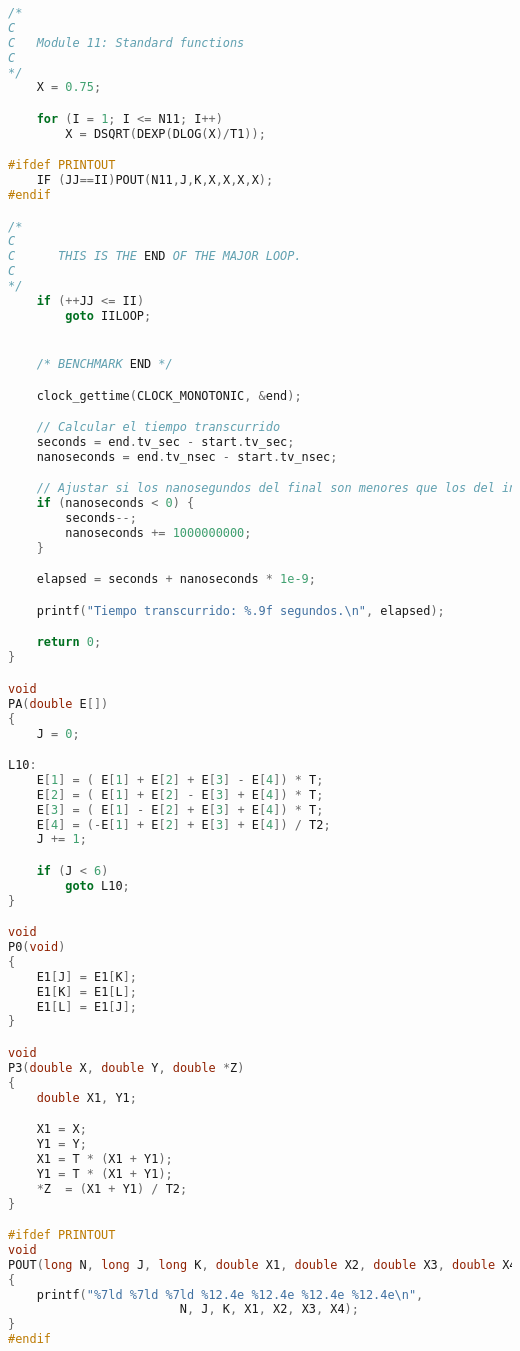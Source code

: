\begin{lstlisting}[language=C,frame=single,showstringspaces=false,caption={Código fuente del benchmark Whetstone},label=lst:whetstone-benchmark]
/*
C
C	Module 11: Standard functions
C
*/
	X = 0.75;

	for (I = 1; I <= N11; I++)
		X = DSQRT(DEXP(DLOG(X)/T1));

#ifdef PRINTOUT
	IF (JJ==II)POUT(N11,J,K,X,X,X,X);
#endif

/*
C
C      THIS IS THE END OF THE MAJOR LOOP.
C
*/
	if (++JJ <= II)
		goto IILOOP;


	/* BENCHMARK END */

	clock_gettime(CLOCK_MONOTONIC, &end);

	// Calcular el tiempo transcurrido
    seconds = end.tv_sec - start.tv_sec;
    nanoseconds = end.tv_nsec - start.tv_nsec;

    // Ajustar si los nanosegundos del final son menores que los del inicio
    if (nanoseconds < 0) {
        seconds--;
        nanoseconds += 1000000000;
    }

    elapsed = seconds + nanoseconds * 1e-9;

    printf("Tiempo transcurrido: %.9f segundos.\n", elapsed);

	return 0;
}

void
PA(double E[])
{
	J = 0;

L10:
	E[1] = ( E[1] + E[2] + E[3] - E[4]) * T;
	E[2] = ( E[1] + E[2] - E[3] + E[4]) * T;
	E[3] = ( E[1] - E[2] + E[3] + E[4]) * T;
	E[4] = (-E[1] + E[2] + E[3] + E[4]) / T2;
	J += 1;

	if (J < 6)
		goto L10;
}

void
P0(void)
{
	E1[J] = E1[K];
	E1[K] = E1[L];
	E1[L] = E1[J];
}

void
P3(double X, double Y, double *Z)
{
	double X1, Y1;

	X1 = X;
	Y1 = Y;
	X1 = T * (X1 + Y1);
	Y1 = T * (X1 + Y1);
	*Z  = (X1 + Y1) / T2;
}

#ifdef PRINTOUT
void
POUT(long N, long J, long K, double X1, double X2, double X3, double X4)
{
	printf("%7ld %7ld %7ld %12.4e %12.4e %12.4e %12.4e\n",
						N, J, K, X1, X2, X3, X4);
}
#endif
\end{lstlisting}

